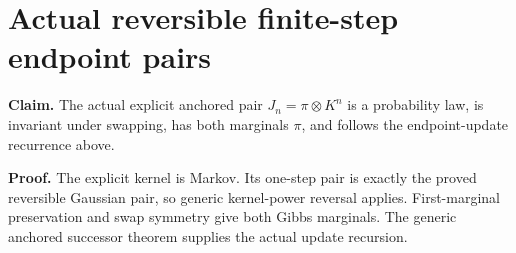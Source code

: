 \documentclass[11pt,a4paper]{article}
\begin{document}
\section{\texorpdfstring{Actual reversible finite-step endpoint pairs}{Actual reversible finite-step endpoint pairs}}


\textbf{Claim.} The actual explicit anchored pair \(J_n=\pi\otimes K^n\) is a probability law, is invariant under swapping, has both marginals \(\pi\), and follows the endpoint-update recurrence above.



\textbf{Proof.} The explicit kernel is Markov. Its one-step pair is exactly the proved reversible Gaussian pair, so generic kernel-power reversal applies. First-marginal preservation and swap symmetry give both Gibbs marginals. The generic anchored successor theorem supplies the actual update recursion.
\end{document}
